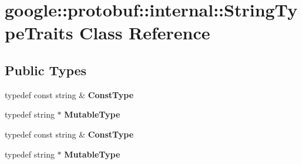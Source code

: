 \hypertarget{classgoogle_1_1protobuf_1_1internal_1_1StringTypeTraits}{}\section{google\+:\+:protobuf\+:\+:internal\+:\+:String\+Type\+Traits Class Reference}
\label{classgoogle_1_1protobuf_1_1internal_1_1StringTypeTraits}
\subsection*{Public Types}
\begin{DoxyCompactItemize}
\item 
\mbox{\label{classgoogle_1_1protobuf_1_1internal_1_1StringTypeTraits_a7b9c9fcb6f789d3f82653534b7a18b45}} 
typedef const string \& {\bfseries Const\+Type}
\item 
\mbox{\label{classgoogle_1_1protobuf_1_1internal_1_1StringTypeTraits_a7172c41982cceaeda707727ba53e0b51}} 
typedef string $\ast$ {\bfseries Mutable\+Type}
\item 
\mbox{\label{classgoogle_1_1protobuf_1_1internal_1_1StringTypeTraits_a7b9c9fcb6f789d3f82653534b7a18b45}} 
typedef const string \& {\bfseries Const\+Type}
\item 
\mbox{\label{classgoogle_1_1protobuf_1_1internal_1_1StringTypeTraits_a7172c41982cceaeda707727ba53e0b51}} 
typedef string $\ast$ {\bfseries Mutable\+Type}
\end{DoxyCompactItemize}
